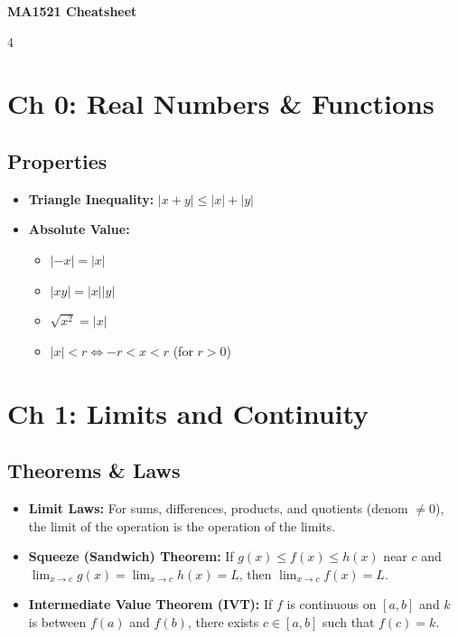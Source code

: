 \documentclass[8pt, landscape, a4paper]{scrartcl}
\begin{document}
\begin{center}
    {\Huge \textbf{MA1521 Cheatsheet}}
\end{center}

\begin{multicols*}{4}

\section*{Ch 0: Real Numbers \& Functions}
\subsection*{Properties}
\begin{itemize}
    \item \textbf{Triangle Inequality:} $|x + y| \le |x| + |y|$
    \item \textbf{Absolute Value:}
    \begin{itemize}
        \item $|-x| = |x|$
        \item $|xy| = |x||y|$
        \item $\sqrt{x^2} = |x|$
        \item $|x| < r \iff -r < x < r$ (for $r > 0$)
    \end{itemize}
\end{itemize}

\section*{Ch 1: Limits and Continuity}
\subsection*{Theorems \& Laws}
\begin{itemize}
    \item \textbf{Limit Laws:} For sums, differences, products, and quotients (denom $\neq 0$), the limit of the operation is the operation of the limits.
    \item \textbf{Squeeze (Sandwich) Theorem:} If $g(x) \le f(x) \le h(x)$ near $c$ and $\lim_{x \to c} g(x) = \lim_{x \to c} h(x) = L$, then $\lim_{x \to c} f(x) = L$.
    \item \textbf{Intermediate Value Theorem (IVT):} If $f$ is continuous on $[a, b]$ and $k$ is between $f(a)$ and $f(b)$, there exists $c \in [a, b]$ such that $f(c) = k$.
\end{itemize}


\end{multicols*}
\end{document}

